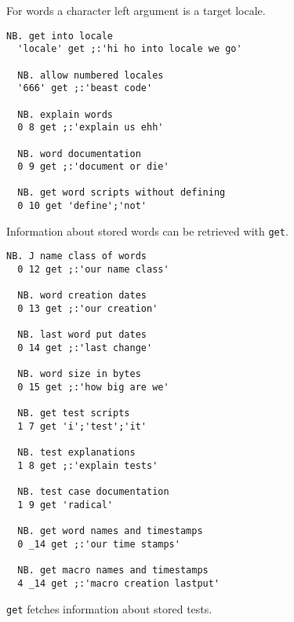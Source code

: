  For words a character left argument is a target locale.
  
\begin{lstlisting}[frame=single,framerule=0pt]  
  NB. get into locale
  'locale' get ;:'hi ho into locale we go'  
  
  NB. allow numbered locales
  '666' get ;:'beast code'  
    
  NB. explain words
  0 8 get ;:'explain us ehh'  
  
  NB. word documentation
  0 9 get ;:'document or die' 
  
  NB. get word scripts without defining 
  0 10 get 'define';'not' 
\end{lstlisting} 
    
  Information about stored words can be retrieved with \texttt{get}.
  
\begin{lstlisting}[frame=single,framerule=0pt]
  NB. J name class of words
  0 12 get ;:'our name class' 
  
  NB. word creation dates
  0 13 get ;:'our creation'   
  
  NB. last word put dates
  0 14 get ;:'last change'    
  
  NB. word size in bytes
  0 15 get ;:'how big are we' 
  
  NB. get test scripts
  1 7 get 'i';'test';'it'  
     
  NB. test explanations
  1 8 get ;:'explain tests'   
  
  NB. test case documentation
  1 9 get 'radical'
  
  NB. get word names and timestamps 
  0 _14 get ;:'our time stamps'
  
  NB. get macro names and timestamps
  4 _14 get ;:'macro creation lastput'        
\end{lstlisting}         

  \texttt{get} fetches information about stored tests.
  

